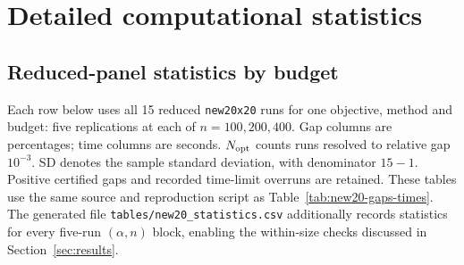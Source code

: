 \clearpage
\section{Detailed computational statistics}\label{app:alpha}

\subsection{Reduced-panel statistics by budget}

Each row below uses all 15 reduced \texttt{new20x20} runs for one
objective, method and budget: five replications at each of
$n=100,200,400$. Gap columns are percentages; time columns are seconds.
$N_{\rm opt}$ counts runs resolved to relative gap $10^{-3}$.
SD denotes the sample standard deviation, with denominator $15-1$.
Positive certified gaps and recorded time-limit overruns are retained.
These tables use the same source and reproduction script as
Table~\ref{tab:new20-gaps-times}. The generated file
\texttt{tables/new20\_statistics.csv} additionally records statistics
for every five-run $(\alpha,n)$ block, enabling the within-size
checks discussed in Section~\ref{sec:results}.

\begin{center}
\begin{minipage}{0.98\linewidth}\centering\small
\setlength{\tabcolsep}{3pt}
\label{tab:alpha-Expected}

\end{minipage}
\end{center}
\clearpage
\begin{center}
\begin{minipage}{0.98\linewidth}\centering\small
\setlength{\tabcolsep}{3pt}
\label{tab:alpha-CVaR}

\end{minipage}
\end{center}
\clearpage
\begin{center}
\begin{minipage}{0.98\linewidth}\centering\small
\setlength{\tabcolsep}{3pt}
\label{tab:alpha-MeanCVaR}

\end{minipage}
\end{center}
